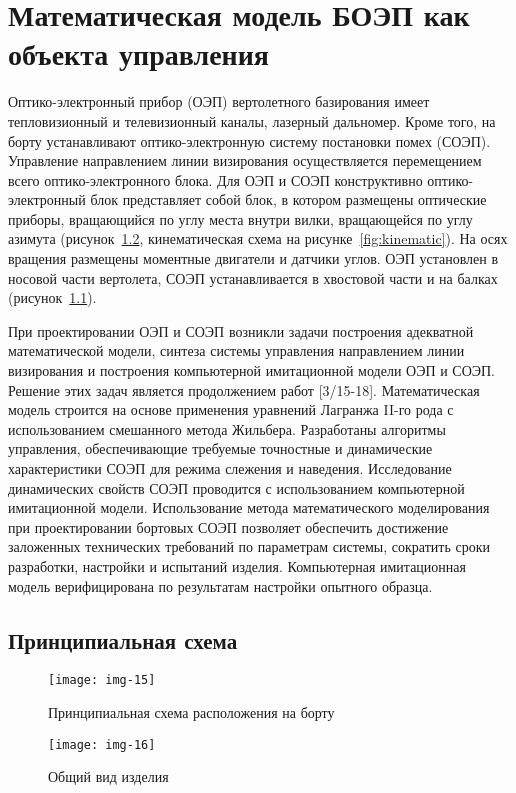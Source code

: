 \chapter{Математическая модель БОЭП как объекта управления} \label{ch:ch3}

Оптико-электронный прибор (ОЭП) вертолетного базирования имеет тепловизионный и телевизионный каналы, лазерный дальномер. Кроме того, на борту устанавливают оптико-электронную систему постановки помех (СОЭП).  Управление направлением линии визирования осуществляется перемещением всего оптико-электронного блока. Для ОЭП и СОЭП конструктивно оптико-электронный блок представляет собой блок, в котором размещены оптические приборы, вращающийся по углу места внутри вилки, вращающейся по углу азимута 
(рисунок~\ref{fig:device}, кинематическая схема на рисунке~\ref{fig:kinematic}). 
На осях вращения размещены моментные двигатели и датчики углов. ОЭП установлен в носовой части вертолета, СОЭП устанавливается в хвостовой части и на балках 
(рисунок~\ref{fig:helicopter}).

При проектировании ОЭП и СОЭП возникли задачи построения адекватной математической модели, синтеза системы управления направлением линии визирования и построения компьютерной имитационной модели ОЭП и СОЭП. Решение этих задач является продолжением работ [3/15-18]. Математическая модель строится на основе применения уравнений Лагранжа II-го рода с использованием смешанного метода Жильбера. Разработаны алгоритмы управления, обеспечивающие требуемые точностные и динамические характеристики СОЭП для режима слежения и наведения. Исследование динамических свойств СОЭП проводится с использованием компьютерной имитационной модели. Использование метода математического моделирования при проектировании бортовых СОЭП позволяет обеспечить достижение заложенных технических требований по параметрам системы, сократить сроки разработки, настройки и испытаний изделия. Компьютерная имитационная модель верифицирована по результатам настройки опытного образца.

\begin{landscape}
\section{Принципиальная схема} \label{ch:ch3/sect1}

\begin{figure}[ht]
	\centering
	\texttt{[image: img-15]} 
	\caption{Принципиальная схема расположения на борту}
	\label{fig:helicopter}
\end{figure}

\begin{figure}[ht]
	\centering
	\texttt{[image: img-16]} 
	\caption{Общий вид изделия}
	\label{fig:device}
\end{figure}
\end{landscape}

